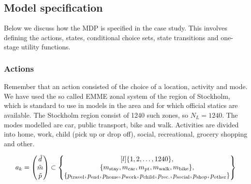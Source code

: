 \subsection{Model specification}
Below we discuss how the MDP is specified in the case study. This involves defining the actions, states, conditional choice sets, state transitions and one-stage utility functions.  
\subsubsection{Actions}
Remember that an action consisted of the choice of a location, activity and mode. We have used the so called EMME zonal system of the region of Stockholm, which is standard to use in models in the area and for which official statics are available. The Stockholm region consist of 1240 such zones, so $N_L = 1240$. The modes modelled are car, public transport, bike and walk. Activities are divided into home, work, child (pick up or drop off), social, recreational, grocery shopping and other.

\begin{equation} 
a_k = \begin{pmatrix}
\act{d} \\
\act{m} \\
\act{p}    
\end{pmatrix}
\subset
\begin{Bmatrix*}[l]
\{1,2,\dots, 1240\}, \\
\{m_{\text{stay}},\m{car},\m{pt},\m{walk},\m{bike}\}, \\
\{ p_{\text{travel}},p_{\text{end}},\p{home},\p{work},\p{child},\p{rec.},\p{social},\p{shop},\p{other}\} 
\end{Bmatrix*}
\end{equation}

